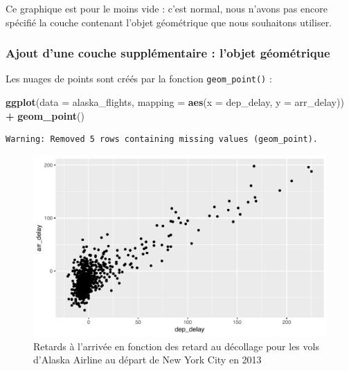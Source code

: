 \documentclass[a4paperpaper,]{article}
\newenvironment{Shaded}{\begin{snugshade}}{\end{snugshade}}
\newcommand{\KeywordTok}[1]{\textcolor[rgb]{0.13,0.29,0.53}{\textbf{#1}}}
\newcommand{\DataTypeTok}[1]{\textcolor[rgb]{0.13,0.29,0.53}{#1}}
\newcommand{\StringTok}[1]{\textcolor[rgb]{0.31,0.60,0.02}{#1}}
\newcommand{\OperatorTok}[1]{\textcolor[rgb]{0.81,0.36,0.00}{\textbf{#1}}}
\newcommand{\NormalTok}[1]{#1}
\theoremstyle{definition}
\theoremstyle{definition}
\theoremstyle{definition}
\theoremstyle{remark}
\begin{document}
Ce graphique est pour le moins vide : c'est normal, nous n'avons pas
encore spécifié la couche contenant l'objet géométrique que nous
souhaitons utiliser.

\subsubsection{Ajout d'une couche supplémentaire : l'objet
géométrique}\label{ajout-dune-couche-supplementaire-lobjet-geometrique}

Les nuages de points sont créés par la fonction \texttt{geom\_point()} :

\begin{Shaded}
\begin{Highlighting}[]
\KeywordTok{ggplot}\NormalTok{(}\DataTypeTok{data =}\NormalTok{ alaska_flights, }\DataTypeTok{mapping =} \KeywordTok{aes}\NormalTok{(}\DataTypeTok{x =}\NormalTok{ dep_delay, }\DataTypeTok{y =}\NormalTok{ arr_delay)) }\OperatorTok{+}\StringTok{ }
\StringTok{  }\KeywordTok{geom_point}\NormalTok{()}
\end{Highlighting}
\end{Shaded}

\begin{verbatim}
Warning: Removed 5 rows containing missing values (geom_point).
\end{verbatim}

\begin{figure}[htpb]

{\centering \includegraphics[width=0.9\linewidth]{figure/unnamed-chunk-38-1} 

}

\caption{Retards à l'arrivée en fonction des retard au décollage pour les vols d'Alaska Airline au départ de New York City en 2013}\label{fig:unnamed-chunk-38}
\end{figure}
\end{document}
